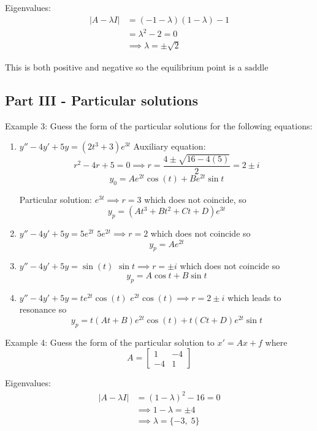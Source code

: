 \documentclass[12pt]{article}
\begin{document}
Eigenvalues:
\begin{align*}
    |A - \lambda I| &= (-1 - \lambda)(1 - \lambda) - 1\\
    &= \lambda^2 - 2 = 0\\
    &\implies \lambda = \pm \sqrt{2}
\end{align*}

This is both positive and negative so the equilibrium point is a $\boxed{\text{saddle}}$

\subsection*{Part III - Particular solutions}
Example 3: Guess the form of the particular solutions for the following equations:
\begin{enumerate}
    \item $y'' - 4y' + 5y = (2t^3 + 3)e^{3t}$
    Auxiliary equation:
    \[r^2 - 4r + 5 = 0 \implies r = \frac{4 \pm \sqrt{16 - 4(5)}}{2} = 2 \pm i\]
    \[y_0 = Ae^{2t} \cos(t) + Be^{2t} \sin t\]

    Particular solution:
    $e^{3t} \implies r = 3$ which does not coincide, so 
    \[\boxed{y_p = (At^3 + Bt^2 + Ct + D)e^{3t}}\]
    
    \item $y'' - 4y' + 5y = 5e^{2t}$
    $5e^{2t} \implies r = 2$ which does not coincide so 
    \[\boxed{y_p = Ae^{2t}}\]

    \item $y'' - 4y' + 5y = \sin(t)$
    $\sin t \implies r = \pm i$ which does not coincide so 
    \[\boxed{y_p = A \cos t + B \sin t}\]

    \item $y'' - 4y' + 5y = te^{2t} \cos(t)$ 
    $e^{2t} \cos(t) \implies r = 2 \pm i$ which leads to resonance so 
    \[\boxed{y_p = t(At + B)e^{2t} \cos(t) + t(Ct + D)e^{2t} \sin t}\]
\end{enumerate}

Example 4: Guess the form of the particular solution to $x' = Ax + f$ where
\[A = \begin{bmatrix}
    1 & -4\\
    -4 & 1
\end{bmatrix}\]

Eigenvalues:
\begin{align*}
    |A - \lambda I| &= (1 -\lambda)^2 - 16 = 0\\
    &\implies 1 - \lambda = \pm 4 \\
    &\implies \lambda = \{-3, \; 5\}
\end{align*}
\end{document}
